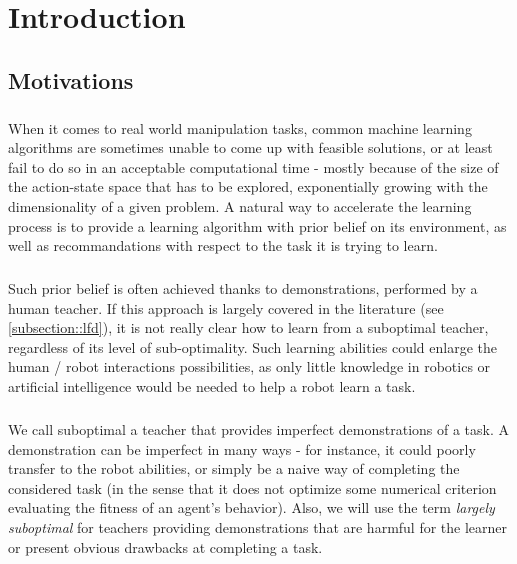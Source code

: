 \documentclass[a4paper]{report}
\begin{document}
	
	
	\tableofcontents

	
	\chapter{Introduction}
	{
		\section{Motivations}
		{
			\paragraph{} When it comes to real world manipulation tasks, common machine learning algorithms are sometimes unable to come up with feasible solutions, or at least fail to do so in an acceptable computational time - mostly because of the size of the action-state space that has to be explored,  exponentially growing with the dimensionality of a given problem.  A natural way to accelerate the learning process is to provide a learning algorithm with prior belief on its environment, as well as recommandations with respect to the task it is trying to learn. 
			
			\paragraph{} Such prior belief is often achieved thanks to demonstrations, performed by a human teacher. If this approach is largely covered in the literature (see \ref{subsection::lfd}), it is not really clear how to learn from a suboptimal teacher, regardless of its level of sub-optimality. Such learning abilities could enlarge the human / robot interactions possibilities, as only little knowledge in robotics or artificial intelligence would be needed to help a robot learn a task. 
			
			\paragraph{} We call suboptimal a teacher that provides imperfect demonstrations of a task. A demonstration can be imperfect in many ways - for instance, it could poorly transfer to the robot abilities, or simply be a naive way of completing the considered task (in the sense that it does not optimize some numerical criterion evaluating the fitness of an agent's behavior). Also, we will use the term \emph{largely suboptimal} for teachers providing demonstrations that are harmful for the learner or present obvious drawbacks at completing a task. 
			
}}
\end{document}
